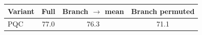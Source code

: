 \begin{tabular}{lccc}
\toprule
Variant & Full & Branch $\to$ mean & Branch permuted \\
\midrule
PQC & 77.0 & 76.3 & 71.1 \\
\bottomrule
\end{tabular}